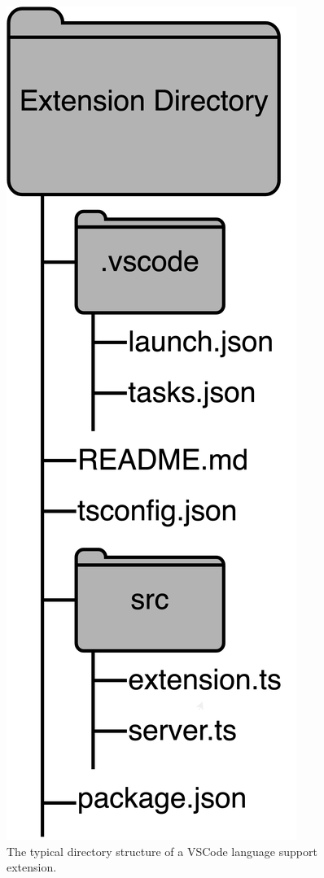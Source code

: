 \documentclass{article}
\begin{document}
\begin{figure}
    \begin{center}
        \includegraphics[height=0.3\textheight]{png/directory-structure.png}
        \caption{
            \centering 
                The typical directory structure of a VSCode language support extension.
        }
        \label{fig:directory-structure}
    \end{center}
\end{figure}
\end{document}
